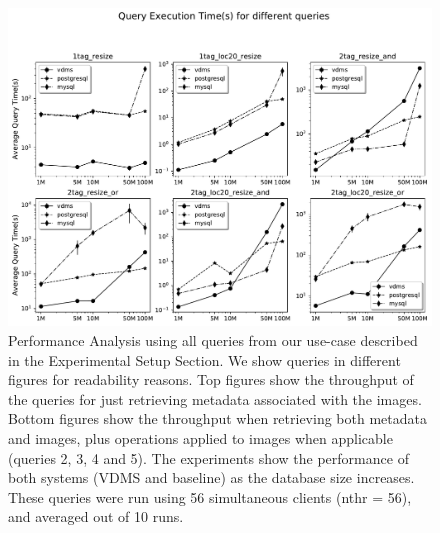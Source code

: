 \begin{figure}[ht]
\includegraphics[width=\textwidth]{figures/plot_56_mosaic_query_times}
\caption{Performance Analysis using all queries from our use-case
described in the Experimental Setup Section.
We show queries in different figures for readability reasons.
Top figures show the throughput of the queries for
just retrieving metadata associated with the images.
Bottom figures show the throughput when retrieving both metadata and images,
plus operations applied to images when applicable (queries 2, 3, 4 and 5).
The experiments show the performance of both systems (VDMS and baseline) as the
database size increases.
These queries were run using 56 simultaneous clients (nthr = 56),
and averaged out of 10 runs.}
\label{fig:q_performance_56}
\end{figure}


